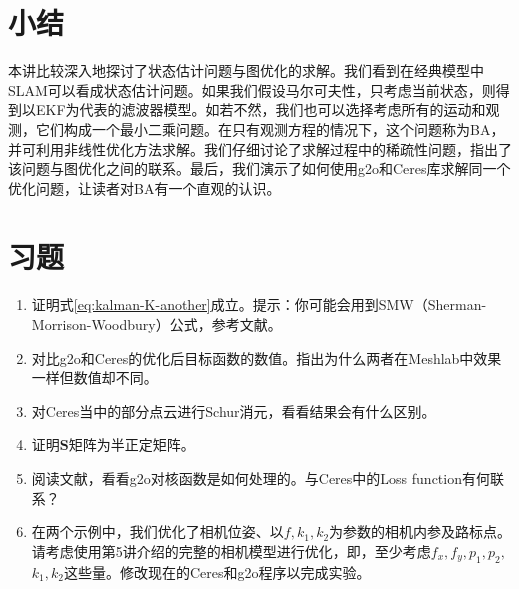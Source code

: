 \section{小结}
本讲比较深入地探讨了状态估计问题与图优化的求解。我们看到在经典模型中SLAM可以看成状态估计问题。如果我们假设马尔可夫性，只考虑当前状态，则得到以EKF为代表的滤波器模型。如若不然，我们也可以选择考虑所有的运动和观测，它们构成一个最小二乘问题。在只有观测方程的情况下，这个问题称为BA，并可利用非线性优化方法求解。我们仔细讨论了求解过程中的稀疏性问题，指出了该问题与图优化之间的联系。最后，我们演示了如何使用g2o和Ceres库求解同一个优化问题，让读者对BA有一个直观的认识。

\section*{习题}
\begin{enumerate}
	\item 证明式\eqref{eq:kalman-K-another}成立。提示：你可能会用到SMW（Sherman-Morrison-Woodbury）公式，参考文献\cite{Sherman1950, Barfoot2016}。
	\item 
	对比g2o和Ceres的优化后目标函数的数值。指出为什么两者在Meshlab中效果一样但数值却不同。
	\item 
	对Ceres当中的部分点云进行Schur消元，看看结果会有什么区别。
	\item 证明$\bm{S}$矩阵为半正定矩阵。
	\item 阅读文献\cite{Kummerle2011}，看看g2o对核函数是如何处理的。与Ceres中的Loss function有何联系？
	\item[\optional] 在两个示例中，我们优化了相机位姿、以$f, k_1, k_2$为参数的相机内参及路标点。请考虑使用第5讲介绍的完整的相机模型进行优化，即，至少考虑$f_x, f_y, p_1, p_2,$ $k_1, k_2$这些量。修改现在的Ceres和g2o程序以完成实验。
\end{enumerate}
